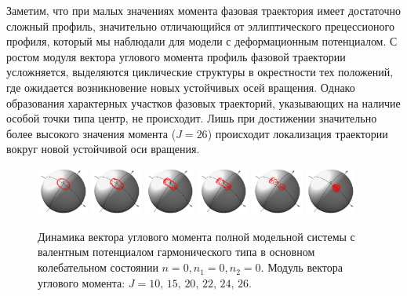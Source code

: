 Заметим, что при малых значениях момента фазовая траектория имеет достаточно сложный профиль, значительно отличающийся от эллиптического прецессионого профиля, который мы наблюдали для модели с деформационным потенциалом. С ростом модуля вектора углового момента профиль фазовой траектории усложняется, выделяются циклические структуры в окрестности тех положений, где ожидается возникновение новых устойчивых осей вращения. Однако образования характерных участков фазовых траекторий, указывающих на наличие особой точки типа центр, не происходит. Лишь при достижении значительно более высокого значения момента ($J = 26$) происходит локализация траектории вокруг новой устойчивой оси вращения.

\begin{figure}[H]
  \centering
	\includegraphics[width=0.15\textwidth]{../pictures/HarmGroundState00/plot_J=10.png}
	\includegraphics[width=0.15\textwidth]{../pictures/HarmGroundState00/plot_J=15.png}
	\includegraphics[width=0.15\textwidth]{../pictures/HarmGroundState00/plot_J=20.png}
	\includegraphics[width=0.15\textwidth]{../pictures/HarmGroundState00/plot_J=22.png}
	\includegraphics[width=0.15\textwidth]{../pictures/HarmGroundState00/plot_J=24.png}
	\includegraphics[width=0.15\textwidth]{../pictures/HarmGroundState00/plot_J=26.png}
	\caption{Динамика вектора углового момента полной модельной системы с валентным потенциалом гармонического типа в основном колебательном состоянии ${n = 0, n_1 = 0, n_2 = 0}$. Модуль вектора углового момента: $J = 10, \, 15, \, 20, \, 22, \, 24, \, 26$.} 
	\label{fig:harm000}
\end{figure}

